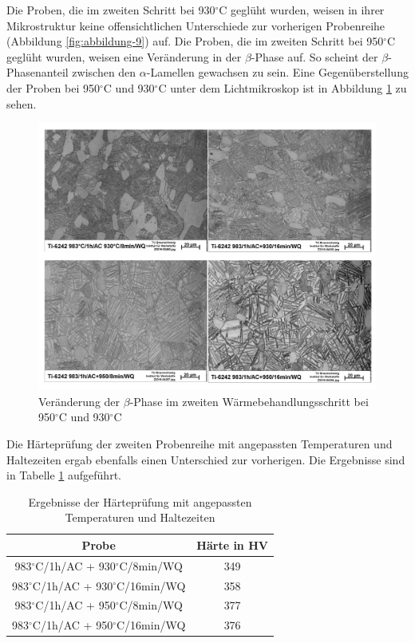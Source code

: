 Die Proben, die im zweiten Schritt bei 930$^\circ$C geglüht wurden, weisen in ihrer Mikrostruktur keine offensichtlichen Unterschiede zur vorherigen Probenreihe (Abbildung \ref{fig:abbildung-9}) auf. Die Proben, die im zweiten Schritt bei 950$^\circ$C geglüht wurden, weisen eine Veränderung in der $\beta$-Phase auf. So scheint der $\beta$-Phasenanteil zwischen den $\alpha$-Lamellen gewachsen zu sein. Eine Gegenüberstellung der Proben bei 950$^\circ$C und 930$^\circ$C unter dem Lichtmikroskop ist in Abbildung \ref{fig:abbildung-15} zu sehen.

\begin{figure}[h]
	\centering
	\includegraphics[width=1.0\linewidth]{./Bilder/Abbildung 15.png}
	\caption[Abbildung 15]{Veränderung der $\beta$-Phase im zweiten Wärmebehandlungsschritt bei 950$^\circ$C und 930$^\circ$C}
	\label{fig:abbildung-15}
\end{figure}

Die Härteprüfung der zweiten Probenreihe mit angepassten Temperaturen und Haltezeiten ergab ebenfalls einen Unterschied zur vorherigen. Die Ergebnisse sind in Tabelle \ref{Tabelle 7} aufgeführt.

\begin{table}
	\centering
	\begin{tabular}{|c|c|}
		\hline 
		Probe & Härte in HV \\ 
		\hline 
		983$^\circ$C/1h/AC + 930$^\circ$C/8min/WQ & 349 \\ 
		\hline 
		983$^\circ$C/1h/AC + 930$^\circ$C/16min/WQ & 358 \\ 
		\hline 
		983$^\circ$C/1h/AC + 950$^\circ$C/8min/WQ & 377 \\ 
		\hline 
		983$^\circ$C/1h/AC + 950$^\circ$C/16min/WQ & 376 \\ 
		\hline 
	\end{tabular} 
	\caption{Ergebnisse der Härteprüfung mit angepassten Temperaturen und Haltezeiten}
	\label{Tabelle 7}
\end{table}

